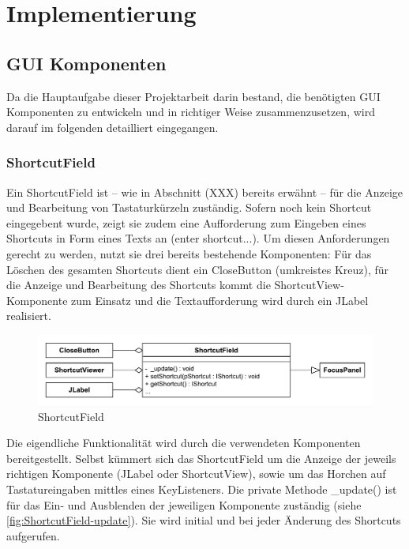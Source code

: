 \section{Implementierung}

\subsection{GUI Komponenten}

Da die Hauptaufgabe dieser Projektarbeit darin bestand, die benötigten GUI Komponenten zu entwickeln und in richtiger Weise zusammenzusetzen, wird darauf im folgenden detailliert eingegangen.

\subsubsection{ShortcutField}

Ein ShortcutField ist -- wie in Abschnitt (XXX) bereits erwähnt -- für die Anzeige und Bearbeitung von Tastaturkürzeln zuständig. Sofern noch kein Shortcut eingegebent wurde, zeigt sie zudem eine Aufforderung zum Eingeben eines Shortcuts in Form eines Texts an (\glqq enter shortcut...\grqq). Um diesen Anforderungen gerecht zu werden, nutzt sie drei bereits bestehende Komponenten: Für das Löschen des gesamten Shortcuts dient ein CloseButton (umkreistes Kreuz), für die Anzeige und Bearbeitung des Shortcuts kommt die ShortcutView-Komponente zum Einsatz und die Textaufforderung wird durch ein JLabel realisiert.

\begin{figure}[H]
	\centering
	\includegraphics[width=0.8\linewidth]{../graphic/diagrams/CD_ShortcutField/ShortcutField}
	\caption{ShortcutField}
	\label{fig:shortcutfield}
\end{figure}

Die eigendliche Funktionalität wird durch die verwendeten Komponenten bereitgestellt. Selbst kümmert sich das ShortcutField um die Anzeige der jeweils richtigen Komponente (JLabel oder ShortcutView), sowie um das Horchen auf Tastatureingaben mittles eines KeyListeners. Die private Methode \_update() ist für das Ein- und Ausblenden der jeweiligen Komponente zuständig (siehe \autoref{fig:ShortcutField-update}). Sie wird initial und bei jeder Änderung des Shortcuts aufgerufen.

